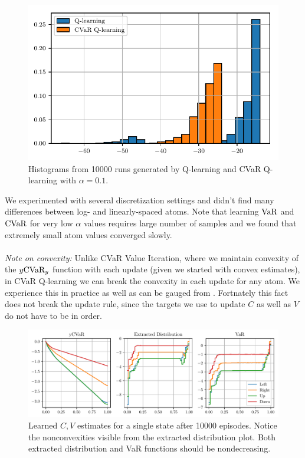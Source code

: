 \begin{figure}[h]
\center
\includegraphics[width=0.6\linewidth]{gfx/sample_hist.pdf}
\caption{Histograms from 10000 runs generated by Q-learning and CVaR Q-learning with $\alpha=0.1$.}
\label{fig:qhist}
\end{figure}

We experimented with several discretization settings and didn't find many differences between log- and linearly-spaced atoms. Note that learning $\text{VaR}$ and $\text{CVaR}$ for very low $\alpha$ values requires large number of samples and we found that extremely small atom values converged slowly.
\\
\\
\textit{Note on convexity:} Unlike CVaR Value Iteration, where we maintain convexity of the $y\text{CVaR}_y$ function with each update (given we started with convex estimates), in CVaR Q-learning we can break the convexity in each update for any atom. We experience this in practice as well as can be gauged from . Fortnately this fact does not break the update rule, since the targets we use to update $C$ as well as $V$ do not have to be in order.


\begin{figure}[h]
\center
\includegraphics[width=\linewidth]{gfx/nonconvex.pdf}
\caption{Learned $C, V$ estimates for a single state after 10000 episodes. Notice the nonconvexities visible from the extracted distribution plot. Both extracted distribution and VaR functions should be nondecreasing.}
\label{fig:nonconvex}
\end{figure}




